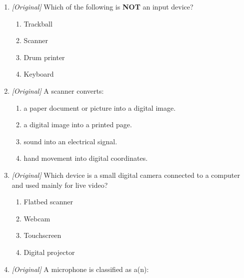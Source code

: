 \documentclass[11pt]{article}
\begin{document}
\begin{enumerate}[label=\textbf{Q\arabic*.}, leftmargin=*]
\begin{enumerate}[label=\arabic*.]
    \item Speaks responses to a caller
    \item Worn on the hand to give touch/force feedback
    \item Worn on the hand to capture hand movement as data
    \item Presents touch sensations to the user
  \end{enumerate}
  \begin{enumerate}[label=\Alph*.]
    \item I-2, II-4, III-1, IV-3
    \item I-3, II-4, III-1, IV-2
    \item I-2, II-1, III-4, IV-3
    \item I-4, II-2, III-3, IV-1
  \end{enumerate}
\item \textit{[Original]} Which of the following is \textbf{NOT} an input
  device?
  \begin{enumerate}[label=\Alph*.]
    \item Trackball
    \item Scanner
    \item Drum printer
    \item Keyboard
  \end{enumerate}
\item \textit{[Original]} A scanner converts:
  \begin{enumerate}[label=\Alph*.]
    \item a paper document or picture into a digital image.
    \item a digital image into a printed page.
    \item sound into an electrical signal.
    \item hand movement into digital coordinates.
  \end{enumerate}
\item \textit{[Original]} Which device is a small digital camera connected to
  a computer and used mainly for live video?
  \begin{enumerate}[label=\Alph*.]
    \item Flatbed scanner
    \item Webcam
    \item Touchscreen
    \item Digital projector
  \end{enumerate}
\item \textit{[Original]} A microphone is classified as a(n):
  \begin{enumerate}[label=\Alph*.]

\end{enumerate}
\end{enumerate}
\end{document}
